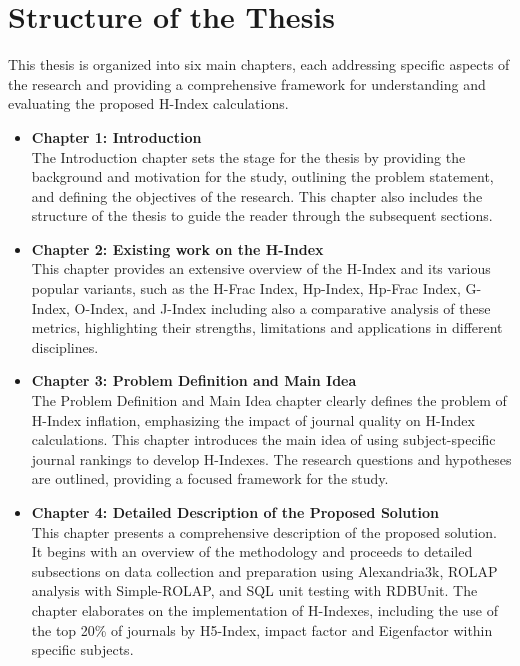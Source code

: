 \section{Structure of the Thesis}
This thesis is organized into six main chapters, each addressing specific
aspects of the research and providing a comprehensive framework for
understanding and evaluating the proposed H-Index calculations.
\begin{itemize}
      \item \textbf{Chapter 1: Introduction} \\
            The Introduction chapter sets the stage for the thesis by providing the background and motivation for the study,
            outlining the problem statement, and defining the objectives of the research. 
            This chapter also includes the structure of the thesis to guide the reader through the subsequent sections.

      \item \textbf{Chapter 2: Existing work on the H-Index} \\
            This chapter provides an extensive overview of the H-Index and its 
            various popular variants, such as the H-Frac Index, Hp-Index, Hp-Frac Index, 
            G-Index, O-Index, and J-Index including also a comparative analysis of these metrics, 
            highlighting their strengths, limitations and applications in different disciplines.

      \item \textbf{Chapter 3: Problem Definition and Main Idea} \\
            The Problem Definition and Main Idea chapter clearly defines the problem of H-Index inflation, 
            emphasizing the impact of journal quality on H-Index calculations. This chapter introduces the main idea of 
            using subject-specific journal rankings to develop H-Indexes. The research questions and hypotheses 
            are outlined, providing a focused framework for the study.

      \item \textbf{Chapter 4: Detailed Description of the Proposed Solution} \\
            This chapter presents a comprehensive description of the proposed solution.
            It begins with an overview of the methodology and proceeds to detailed subsections
            on data collection and preparation using Alexandria3k, ROLAP analysis with Simple-ROLAP,
            and SQL unit testing with RDBUnit. The chapter elaborates on the implementation of H-Indexes,
            including the use of the top 20\% of journals by H5-Index, impact factor and Eigenfactor within specific subjects.


\end{itemize}
